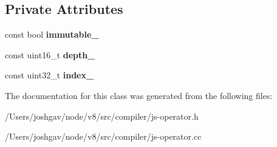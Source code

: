 \subsection*{Private Attributes}
\begin{DoxyCompactItemize}
\item 
const bool {\bfseries immutable\+\_\+}\hypertarget{classv8_1_1internal_1_1compiler_1_1_context_access_a95b0cdf0c59268a24d82977c10d78be0}{}\label{classv8_1_1internal_1_1compiler_1_1_context_access_a95b0cdf0c59268a24d82977c10d78be0}

\item 
const uint16\+\_\+t {\bfseries depth\+\_\+}\hypertarget{classv8_1_1internal_1_1compiler_1_1_context_access_a24bccff157ad176fd3267b206792b2c4}{}\label{classv8_1_1internal_1_1compiler_1_1_context_access_a24bccff157ad176fd3267b206792b2c4}

\item 
const uint32\+\_\+t {\bfseries index\+\_\+}\hypertarget{classv8_1_1internal_1_1compiler_1_1_context_access_af3addbaa19b158e775e3dbf40de6cbc0}{}\label{classv8_1_1internal_1_1compiler_1_1_context_access_af3addbaa19b158e775e3dbf40de6cbc0}

\end{DoxyCompactItemize}


The documentation for this class was generated from the following files\+:\begin{DoxyCompactItemize}
\item 
/\+Users/joshgav/node/v8/src/compiler/js-\/operator.\+h\item 
/\+Users/joshgav/node/v8/src/compiler/js-\/operator.\+cc\end{DoxyCompactItemize}
